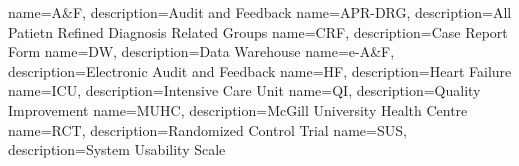  { name=A\&F, description={Audit and Feedback} }
 { name=APR-DRG, description={All Patietn Refined Diagnosis Related Groups} }
 { name=CRF, description={Case Report Form} }
 { name=DW, description={Data Warehouse} }
 { name=e-A\&F, description={Electronic Audit and Feedback} }
 { name=HF, description={Heart Failure} }
 { name=ICU, description={Intensive Care Unit} }
 { name=QI, description={Quality Improvement} }
 { name=MUHC, description={McGill University Health Centre} }
 { name=RCT, description={Randomized Control Trial} }
 { name=SUS, description={System Usability Scale} }
